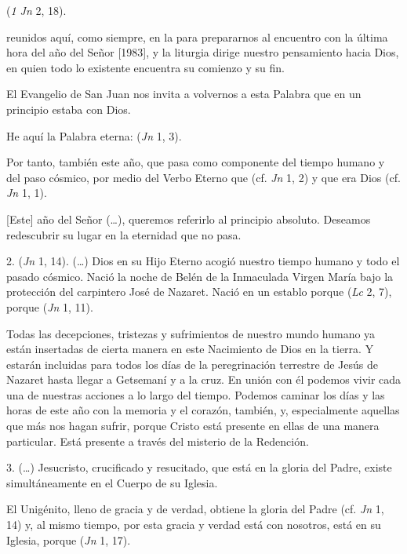 \begin{body}
	 (\emph{1 Jn} 2, 18).
	
	 reunidos aquí, como siempre, en la  para prepararnos al encuentro con la última hora del año del Señor {[}1983{]}, y la liturgia dirige nuestro pensamiento hacia Dios, en quien todo lo existente encuentra su comienzo y su fin.
	
	El Evangelio de San Juan nos invita a volvernos a esta Palabra que en un principio estaba con Dios.
	
	He aquí la Palabra eterna:  (\emph{Jn} 1, 3).
	
	Por tanto, también este año, que pasa como componente del tiempo humano y del paso cósmico,  por medio del Verbo Eterno que  (cf. \emph{Jn} 1, 2) y que era Dios (cf. \emph{Jn} 1, 1).
	
	{[}Este{]} año del Señor (\ldots{}), queremos referirlo al principio absoluto. Deseamos redescubrir su lugar en la eternidad que no pasa.
	
	2.  (\emph{Jn} 1, 14). (\ldots{}) Dios en su Hijo Eterno acogió nuestro tiempo humano y todo el pasado cósmico. Nació la noche de Belén de la Inmaculada Virgen María bajo la protección del carpintero José de Nazaret. Nació en un establo porque  (\emph{Lc} 2, 7), porque  (\emph{Jn} 1, 11).
	
	Todas las decepciones, tristezas y sufrimientos de nuestro mundo humano ya están insertadas de cierta manera en este Nacimiento de Dios en la tierra. Y estarán incluidas para todos los días de la peregrinación terrestre de Jesús de Nazaret hasta llegar a Getsemaní y a la cruz. En unión con él podemos vivir cada una de nuestras acciones a lo largo del tiempo. Podemos caminar los días y las horas de este año con la memoria y el corazón, también, y, especialmente aquellas que más nos hagan sufrir, porque Cristo está presente en ellas de una manera particular. Está presente a través del misterio de la Redención.
	
	3. (\ldots{}) Jesucristo, crucificado y resucitado, que está en la gloria del Padre, existe simultáneamente en el Cuerpo de su Iglesia.
	
	El Unigénito, lleno de gracia y de verdad, obtiene la gloria del Padre (cf. \emph{Jn} 1, 14) y, al mismo tiempo, por esta gracia y verdad está con nosotros, está en su Iglesia, porque  (\emph{Jn} 1, 17).
	

\end{body}
